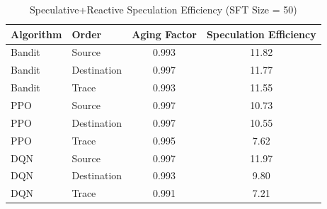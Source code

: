 \begin{table}[ht]
\centering
\caption{Speculative+Reactive Speculation Efficiency (SFT Size = 50)}
\label{tab:speculativereactive-speculation-efficiency-50}
\begin{tabular}{llcc}
\toprule
Algorithm & Order & Aging Factor & Speculation Efficiency \\
\midrule
Bandit & Source & 0.993 & 11.82 \\
Bandit & Destination & 0.997 & 11.77 \\
Bandit & Trace & 0.993 & 11.55 \\
PPO & Source & 0.997 & 10.73 \\
PPO & Destination & 0.997 & 10.55 \\
PPO & Trace & 0.995 & 7.62 \\
DQN & Source & 0.997 & 11.97 \\
DQN & Destination & 0.993 & 9.80 \\
DQN & Trace & 0.991 & 7.21 \\
\bottomrule
\end{tabular}
\end{table}
